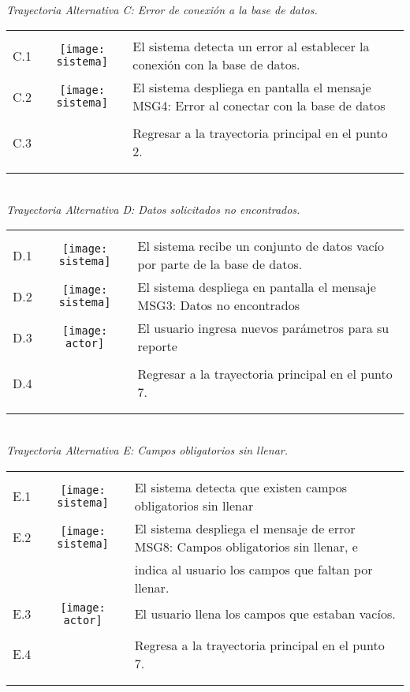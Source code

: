\documentclass[10pt,spanish]{article}
\providecommand{\tabularnewline}{\\}
\begin{document}
\textit{\large \\Trayectoria Alternativa C: Error de conexión a la base de datos.}

\begin{tabular}{ccl}
	& & \tabularnewline
	
	C.1 & \texttt{[image: sistema]} & El sistema detecta un error al establecer la conexión con la base de datos.\tabularnewline
		
	C.2 & \texttt{[image: sistema]} & El sistema despliega en pantalla el mensaje MSG4: Error al conectar con la base de datos \tabularnewline \tabularnewline
		
	C.3 & & Regresar a la trayectoria principal en el punto 2.\tabularnewline
	
	\tabularnewline\tabularnewline	
	\end{tabular}


\textit{\large \\Trayectoria Alternativa D: Datos solicitados no encontrados.}

\begin{tabular}{ccl}
	& & \tabularnewline
	
	D.1 & \texttt{[image: sistema]} & El sistema recibe un conjunto de datos vacío por parte de la base de datos.\tabularnewline
		
	D.2 & \texttt{[image: sistema]} & El sistema despliega en pantalla el mensaje MSG3: Datos no encontrados \tabularnewline
	
	D.3 & \texttt{[image: actor]} & El usuario ingresa nuevos parámetros para su reporte\tabularnewline    
	\tabularnewline    
	
	D.4 & & Regresar a la trayectoria principal en el punto 7.\tabularnewline
	
	\tabularnewline\tabularnewline	
	\end{tabular}

\textit{\large \\Trayectoria Alternativa E: Campos obligatorios sin llenar.}
	
	\begin{tabular}{ccl}
	& & \tabularnewline
			
	E.1 & \texttt{[image: sistema]} & El sistema detecta que existen campos obligatorios sin llenar\tabularnewline
	
	E.2 & \texttt{[image: sistema]} & El sistema despliega el mensaje de error MSG8: Campos obligatorios sin llenar, e \tabularnewline
	& & indica al usuario los campos que faltan por llenar. \tabularnewline

    E.3 & \texttt{[image: actor]} & El usuario llena los campos que estaban vacíos.\tabularnewline
	\tabularnewline
	
	E.4 & &	Regresa a la trayectoria principal en el punto 7.\tabularnewline

	
	\tabularnewline\tabularnewline	
	\end{tabular}
\end{document}
